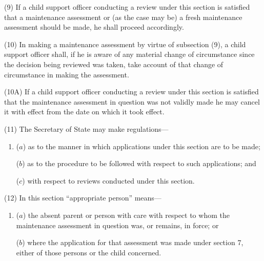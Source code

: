 \documentclass[12pt,a4paper]{article}
\begin{document}
(9) If a child support officer conducting a review under this section is satisfied that a maintenance assessment or (as the case may be) a fresh maintenance assessment should be made, he shall proceed accordingly.

(10) In making a maintenance assessment by virtue of subsection (9), a child support officer shall, if he is aware of any material change of circumstance since the decision being reviewed was taken, take account of that change of circumstance in making the assessment.

(10A) If a child support officer conducting a review under this section is satisfied that the maintenance assessment in question was not validly made he may cancel it with effect from the date on which it took effect.

(11) The Secretary of State may make regulations—
\begin{enumerate}\item[]
($a$) as to the manner in which applications under this section are to be made;

($b$) as to the procedure to be followed with respect to such applications; and

($c$) with respect to reviews conducted under this section.
\end{enumerate}

(12) In this section “appropriate person” means—
\begin{enumerate}\item[]
($a$) the absent parent or person with care with respect to whom the maintenance assessment in question was, or remains, in force; or

($b$) where the application for that assessment was made under section 7, either of those persons or the child concerned.
\end{enumerate}

\end{document}
